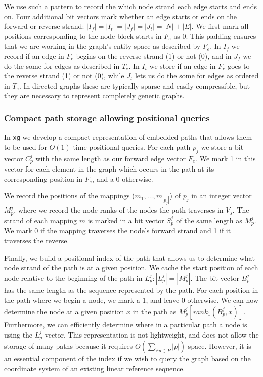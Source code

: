 \documentclass[12pt]{article}
\begin{document}
We use such a pattern to record the which node strand each edge starts and ends on.
Four additional bit vectors mark whether an edge starts or ends on the forward or reverse strand: $|I_f| = |I_t| = |J_f| = |J_t| = |N| + |E|$.
We first mark all positions corresponding to the node block starts in $F_e$ as 0.
This padding ensures that we are working in the graph's entity space as described by $F_e$.
In $I_f$ we record if an edge in $F_e$ begins on the reverse strand (1) or not (0), and in $J_f$ we do the some for edges as described in $T_e$.
In $I_t$ we store if an edge in $F_e$ goes to the reverse strand (1) or not (0), while $J_t$ lets us do the some for edges as ordered in $T_e$.
In directed graphs these are typically sparse and easily compressible, but they are necessary to represent completely generic graphs.

\subsubsection{Compact path storage allowing positional queries}

In {\tt xg} we develop a compact representation of embedded paths that allows them to be used for $O(1)$ time positional queries.
For each path $p_j$ we store a bit vector $C_p^j$ with the same length as our forward edge vector $F_e$.
We mark 1 in this vector for each element in the graph which occurs in the path at its corresponding position in $F_e$, and a 0 otherwise.

We record the positions of the mappings ($m_1, \ldots, m_{|p_j|}$) of $p_j$ in an integer vector $M_p^j$, where we record the node ranks of the nodes the path traverses in $V_s$.
The strand of each mapping $m$ is marked in a bit vector $S_p^j$ of the same length as $M_p^j$.
We mark 0 if the mapping traverses the node's forward strand and 1 if it traverses the reverse.

Finally, we build a positional index of the path that allows us to determine what node strand of the path is at a given position.
We cache the start position of each node relative to the beginning of the path in $L_p^j : |L_p^j| = |M_p^j|$.
The bit vector $B_p^j$ has the same length as the sequence represented by the path.
For each position in the path where we begin a node, we mark a 1, and leave 0 otherwise.
We can now determine the node at a given position $x$ in the path as $M_p^j[rank_1(B_p^j, x)]$.
Furthermore, we can efficiently determine where in a particular path a node is using the $L_p^j$ vector.
This representation is not lightweight, and does not allow the storage of many paths because it requires $O(\sum_{\forall p \in P}{|p|})$ space.
However, it is an essential component of the index if we wish to query the graph based on the coordinate system of an existing linear reference sequence.
\end{document}

